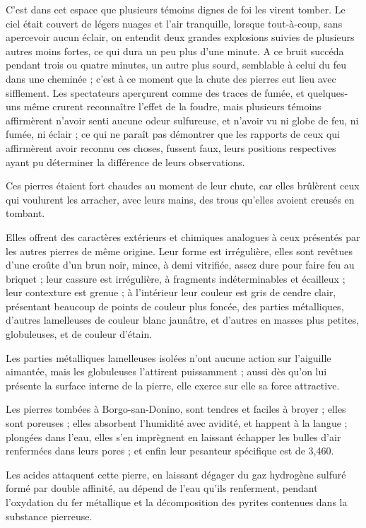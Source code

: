 \documentclass[a4paper, 12pt, oneside, french]{article}
\begin{document}
C'est dans cet espace que plusieurs témoins dignes de foi les virent tomber. Le ciel était couvert de légers nuages et l'air tranquille, lorsque tout-à-coup, sans apercevoir aucun éclair, on entendit deux grandes explosions suivies de plusieurs autres moins fortes, ce qui dura un peu plus d'une minute. A ce bruit succéda pendant trois ou quatre minutes, un autre plus sourd, semblable à celui du feu dans une cheminée ; c'est à ce moment que la chute des pierres eut lieu avec sifflement. Les spectateurs aperçurent comme des traces de fumée, et quelques-uns même crurent reconnaître l'effet de la foudre, mais plusieurs témoins affirmèrent n'avoir senti aucune odeur sulfureuse, et n'avoir vu ni globe de feu, ni fumée, ni éclair ; ce qui ne paraît pas démontrer que les rapports de ceux qui affirmèrent avoir reconnu ces choses, fussent faux, leurs positions respectives ayant pu déterminer la différence de leurs observations.

Ces pierres étaient fort chaudes au moment de leur chute, car elles brûlèrent ceux qui voulurent les arracher, avec leurs mains, des trous qu'elles avoient creusés en tombant.

\og Elles offrent des caractères extérieurs et chimiques analogues à ceux présentés par les autres pierres de même origine. Leur forme est irrégulière, elles sont revêtues d'une croûte d'un brun noir, mince, à demi vitrifiée, assez dure pour faire feu au briquet ; leur cassure est irrégulière, à fragments indéterminables et écailleux ; leur contexture est grenue ; à l'intérieur leur couleur est gris de cendre clair, présentant beaucoup de points de couleur plus foncée, des parties métalliques, d'autres lamelleuses de couleur blanc jaunâtre, et d'autres en masses plus petites, globuleuses, et de couleur d'étain. \fg

\og Les parties métalliques lamelleuses isolées n'ont aucune action sur l'aiguille aimantée, mais les globuleuses l'attirent puissamment ; aussi dès qu'on lui présente la surface interne de la pierre, elle exerce sur elle sa force attractive. \fg

\og Les pierres tombées à Borgo-san-Donino, sont tendres et faciles à broyer ; elles sont poreuses ; elles absorbent l'humidité avec avidité, et happent à la langue ; plongées dans l'eau, elles s'en imprègnent en laissant échapper les bulles d'air renfermées dans leurs pores ; et enfin leur pesanteur spécifique est de 3,460. \fg

\og Les acides attaquent cette pierre, en laissant dégager du gaz hydrogène sulfuré formé par double affinité, au dépend de l'eau qu'ils renferment, pendant l'oxydation du fer métallique et la décomposition des pyrites contenues dans la substance pierreuse. \fg
\end{document}
